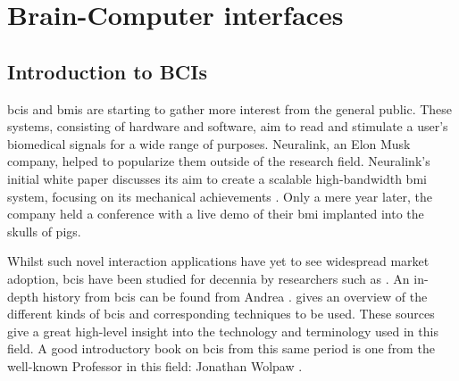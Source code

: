 



\glsresetall

\chapter{Brain-Computer interfaces}
\label{ch:bci}


\section{Introduction to BCIs}
\label{sec:bci_introduction}

\Glspl{bci} and \glspl{bmi} are starting to gather more interest from the general public.
These systems, consisting of hardware and software, aim to read and stimulate a user's biomedical signals for a wide range of purposes.
Neuralink, an Elon Musk company, helped to popularize them outside of the research field.
Neuralink's initial white paper discusses its aim to create a scalable high-bandwidth \gls{bmi} system, focusing on its mechanical achievements \citep{neuralink_whitepaper}.
Only a mere year later, the company held a conference with a live demo of their \gls{bmi} implanted into the skulls of pigs.

Whilst such novel interaction applications have yet to see widespread market adoption, \glspl{bci} have been studied for decennia by researchers such as \citet{early_bci}.
An in-depth history from \glspl{bci} can be found from Andrea \citet{bci_history}.
\citet{bci_review} gives an overview of the different kinds of \glspl{bci} and corresponding techniques to be used.
These sources give a great high-level insight into the technology and terminology used in this field.
A good introductory book on \glspl{bci} from this same period is one from the well-known Professor in this field: Jonathan Wolpaw \citep{bci_book}.

